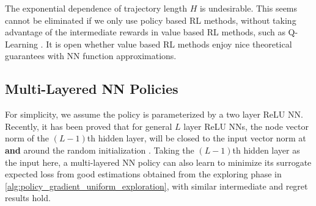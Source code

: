 The exponential dependence of trajectory length $H$ is undesirable. This seems cannot be eliminated if we only use policy based RL methods, without taking advantage of the intermediate rewards in value based RL methods, such as Q-Learning \citep{jin2018q}. It is open whether value based RL methods enjoy nice theoretical guarantees with NN function approximations.

\subsection{Multi-Layered NN Policies}

For simplicity, we assume the policy is parameterized by a two layer ReLU NN. Recently, it has been proved that for general $L$ layer ReLU NNs, the node vector norm of the $(L-1)$th hidden layer, will be closed to the input vector norm at \textbf{and} around the random initialization \citep{allen2018convergenceA,allen2018convergenceB}. Taking the $(L-1)$th hidden layer as the input here, a multi-layered NN policy can also learn to minimize its surrogate expected loss from  good estimations obtained from the exploring phase in \cref{alg:policy_gradient_uniform_exploration}, with similar intermediate and regret results hold.

